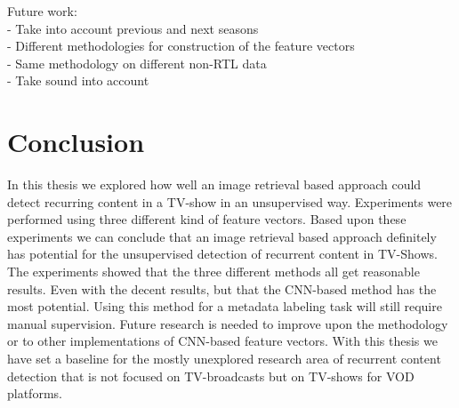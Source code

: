 \documentclass{article}
\begin{document}
Future work: \\
- Take into account previous and next seasons\\
- Different methodologies for construction of the feature vectors\\
- Same methodology on different non-RTL data\\
- Take sound into account
\fi


\section{Conclusion}
In this thesis we explored how well an image retrieval based approach could detect recurring content in a TV-show in an unsupervised way. Experiments were performed using three different kind of feature vectors. Based upon these experiments we can conclude that an image retrieval based approach definitely has potential for the unsupervised detection of recurrent content in TV-Shows. The experiments showed that the three different methods all get reasonable results. Even with the decent results, but that the CNN-based method has the most potential. Using this method for a metadata labeling task will still require manual supervision. Future research is needed to improve upon the methodology or to other implementations of CNN-based feature vectors. With this thesis we have set a baseline for the mostly unexplored research area of recurrent content detection that is not focused on TV-broadcasts but on TV-shows for VOD platforms.



\end{document}
